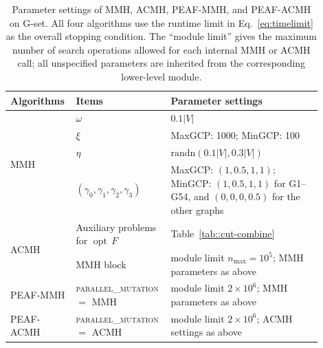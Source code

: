 \documentclass[12pt, a4paper]{article}%
\DeclareMathOperator*{\opt}{\ensuremath{opt}}
\newcommand{\randn}{\ensuremath{\mathrm{randn}}}
\numberwithin{equation}{section}
\theoremstyle{plain}
\begin{document}
			
			

\begin{table}[htbp]
	\centering
	\small
	\caption[Auxiliary cuts]{{Parameter settings of MMH, ACMH, PEAF-MMH, and
	PEAF-ACMH on G-set. All four algorithms use the runtime limit in
	Eq.~\eqref{eq:timelimit} as the overall stopping condition. The ``module limit'' gives the maximum number of search operations allowed for
	each internal MMH or ACMH call; all unspecified parameters are inherited
	from the corresponding lower-level module.}}
	\label{tab::parameter}
	\begin{tabular}{|p{0.18\linewidth}|p{0.25\linewidth}|p{0.47\linewidth}|}
		\hline
		Algorithms & Items & Parameter settings \\ \hline
		\multirow{4}{*}{MMH}
		& $\omega$ & $0.1|V|$ \\ \cline{2-3}
		& $\xi$ & MaxGCP: 1000; MinGCP: 100 \\ \cline{2-3}
		& $\eta$ & $\randn(0.1|V|,0.3|V|)$ \\ \cline{2-3}
		& $(\gamma_0,\gamma_1,\gamma_2,\gamma_3)$
		& MaxGCP: $(1,0.5,1,1)$;
		MinGCP: $(1,0.5,1,1)$ for G1--G54, and $(0,0,0,0.5)$ for the other graphs \\ \hline
		\multirow{2}{*}{ACMH}
		& Auxiliary problems for $\opt\,F$
		& Table~\ref{tab::cut-combine} \\ \cline{2-3}
		& MMH block
		& module limit $n_{\max}=10^5$; MMH parameters as above \\ \hline
		PEAF-MMH
		& \textsc{parallel\_mutation} $=$ MMH
		& module limit $2\times 10^6$; MMH parameters as above \\ \hline
		PEAF-ACMH
		& \textsc{parallel\_mutation} $=$ ACMH
		& module limit $2\times 10^6$; ACMH settings as above \\ \hline
	\end{tabular}
\end{table}
			
\end{document}

